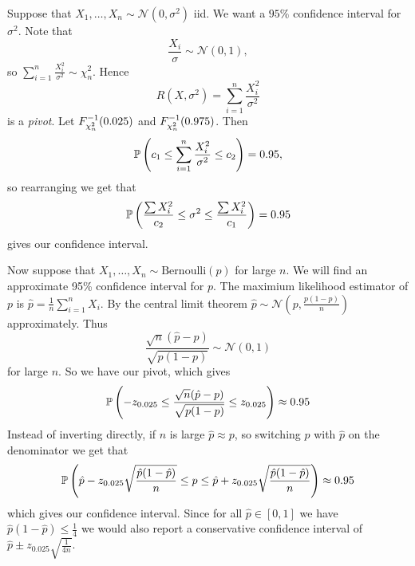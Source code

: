 \documentclass{article}
\begin{document}
Suppose that $ X_1,\dots, X_n\sim \mathcal N(0,\sigma^2) $ iid. We want a $ 95\% $ confidence interval for $ \sigma^2 $. Note that
\[
	\frac{X_i} \sigma \sim \mathcal N(0,1),
\]
so $ \sum_{i=1}^n \frac{X_i^2}{\sigma^2}\sim \chi^2_n $. Hence \[
	R(X,\sigma^2) = \sum_{i=1}^n \frac{X_i^2}{\sigma^2}
\]
is a \textit{pivot}. Let $ {F}^{-1}_{\chi^2_n}(0.025) $ and $ {F}^{-1}_{\chi^2_n}(0.975) $. Then
\begin{align*}
	\mathbb{P}\left({c_1\le \sum_{i=1}^n \frac{X_i^2}{\sigma^2} \le c_2}\right) = 0.95,
\end{align*}
so rearranging we get that
\[
	\mathbb{P}\left({\frac{\sum X_i^2}{c_2} \le \sigma^2 \le \frac{\sum X_i^2}{c_1}}\right)=0.95
\]
gives our confidence interval.
\par
Now suppose that $ X_1,\dots, X_n\sim \mathrm{Bernoulli}(p) $ for large $ n $. We will find an approximate 95\% confidence interval for $ p $. The maximium likelihood estimator of $ p $ is $ \hat p = \frac 1n \sum_{i=1}^n X_i $. By the central limit theorem $ \hat p \sim \mathcal N\left(p,\frac{p(1-p)}n\right) $ approximately. Thus
\[
	\frac{\sqrt n (\hat p - p)}{\sqrt{p(1-p)}}\sim \mathcal N(0,1)
\]
for large $ n $. So we have our pivot, which gives
\[
	\mathbb{P}\left({-z_{0.025} \le \frac{\sqrt n(\hat p -p)}{\sqrt{p(1-p)}} \le z_{0.025}}\right) \approx 0.95
\]
Instead of inverting directly, if $ n $ is large $ \hat p \approx p $, so switching $ p $ with $ \hat p $ on the denominator we get that
\[
	\mathbb{P}\left({\hat p - z_{0.025}\sqrt{\frac{\hat p(1-\hat p)}n}\le p\le \hat p + z_{0.025}\sqrt{\frac{\hat p(1-\hat p)}n}}\right)\approx 0.95
\]
which gives our confidence interval. Since for all $ \hat p \in [0,1] $ we have $ \hat p(1-\hat p)\le \frac 14 $ we would also report a conservative confidence interval of $ \hat p \pm z_{0.025}\sqrt{\frac 1{4n}} $.
\end{document}
